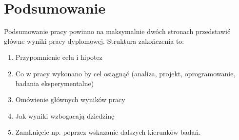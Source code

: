 %


\chapter*{Podsumowanie}

Podsumowanie pracy powinno na maksymalnie dwóch stronach przedstawić główne wyniki pracy dyplomowej. Struktura zakończenia to:
\begin{enumerate}
\item Przypomnienie celu i hipotez
\item Co w pracy wykonano by cel osiągnąć (analiza, projekt, oprogramowanie, badania eksperymentalne)
\item Omówienie głównych wyników pracy
\item Jak wyniki wzbogacają dziedzinę
\item Zamknięcie np. poprzez wskazanie dalszych kierunków badań.
\end{enumerate}